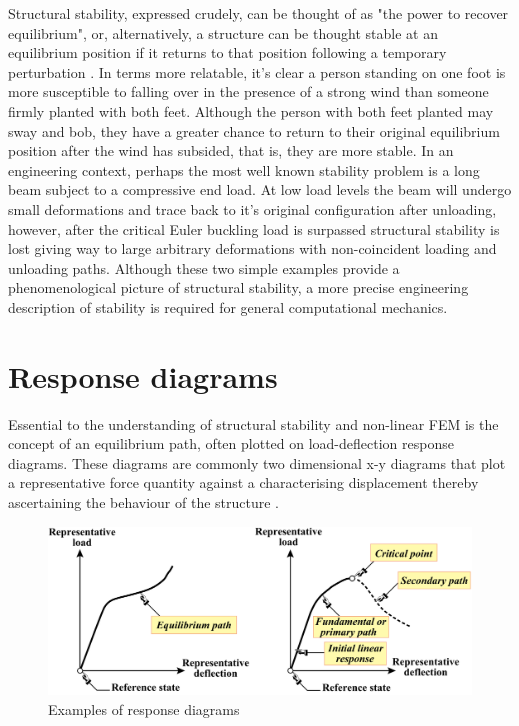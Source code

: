 Structural stability, expressed crudely, can be thought of as "the power to recover equilibrium", or, alternatively, a structure can be thought stable at an equilibrium position if it returns to that position following a temporary perturbation \cite{FelippaStabilityBasics2016}. In terms more relatable, it's clear a person standing on one foot is more susceptible to falling over in the presence of a strong wind than someone firmly planted with both feet. Although the person with both feet planted may sway and bob, they have a greater chance to return to their original equilibrium position after the wind has subsided, that is, they are more stable. In an engineering context, perhaps the most well known stability problem is a long beam subject to a compressive end load. At low load levels the beam will undergo small deformations and trace back to it's original configuration after unloading, however, after the critical Euler buckling load is surpassed structural stability is lost giving way to large arbitrary deformations with non-coincident loading and unloading paths. Although these two simple examples provide a phenomenological picture of structural stability, a more precise engineering description of stability is required for general computational mechanics.

\section{Response diagrams}
Essential to the understanding of structural stability and non-linear FEM is the concept of an equilibrium path, often plotted on load-deflection response diagrams. These diagrams are commonly two dimensional x-y diagrams that plot a representative force quantity against a characterising displacement thereby ascertaining the behaviour of the structure \cite{FelippaNFEMTour2016}.

\begin{figure}[H]
	\centering
	\def\svgwidth{\columnwidth}
	\includegraphics[width=12cm]{images/stability_response_diagram.png}
	\caption{Examples of response diagrams \cite{FelippaNFEMTour2016}}
	\label{stab0}
\end{figure}


